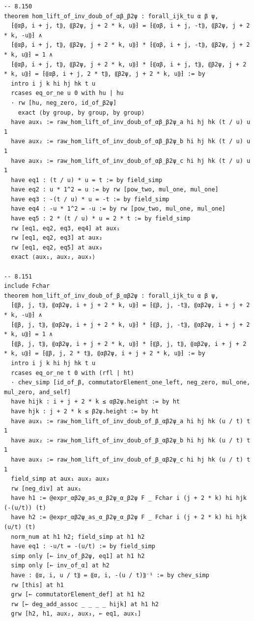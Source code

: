 \begin{Verbatim}
-- 8.150
theorem hom_lift_of_inv_doub_of_αβ_β2ψ : forall_ijk_tu α β ψ,
  ⁅⸨αβ, i + j, t⸩, ⸨β2ψ, j + 2 * k, u⸩⁆ = ⁅⸨αβ, i + j, -t⸩, ⸨β2ψ, j + 2 * k, -u⸩⁆ ∧
  ⁅⸨αβ, i + j, t⸩, ⸨β2ψ, j + 2 * k, u⸩⁆ * ⁅⸨αβ, i + j, -t⸩, ⸨β2ψ, j + 2 * k, u⸩⁆ = 1 ∧
  ⁅⸨αβ, i + j, t⸩, ⸨β2ψ, j + 2 * k, u⸩⁆ * ⁅⸨αβ, i + j, t⸩, ⸨β2ψ, j + 2 * k, u⸩⁆ = ⁅⸨αβ, i + j, 2 * t⸩, ⸨β2ψ, j + 2 * k, u⸩⁆ := by
  intro i j k hi hj hk t u
  rcases eq_or_ne u 0 with hu | hu
  · rw [hu, neg_zero, id_of_β2ψ]
    exact ⟨by group, by group, by group⟩
  have aux₁ := raw_hom_lift_of_inv_doub_of_αβ_β2ψ_a hi hj hk (t / u) u 1
  have aux₂ := raw_hom_lift_of_inv_doub_of_αβ_β2ψ_b hi hj hk (t / u) u 1
  have aux₃ := raw_hom_lift_of_inv_doub_of_αβ_β2ψ_c hi hj hk (t / u) u 1
  have eq1 : (t / u) * u = t := by field_simp
  have eq2 : u * 1^2 = u := by rw [pow_two, mul_one, mul_one]
  have eq3 : -(t / u) * u = -t := by field_simp
  have eq4 : -u * 1^2 = -u := by rw [pow_two, mul_one, mul_one]
  have eq5 : 2 * (t / u) * u = 2 * t := by field_simp
  rw [eq1, eq2, eq3, eq4] at aux₁
  rw [eq1, eq2, eq3] at aux₂
  rw [eq1, eq2, eq5] at aux₃
  exact ⟨aux₁, aux₂, aux₃⟩

-- 8.151
include Fchar
theorem hom_lift_of_inv_doub_of_β_αβ2ψ : forall_ijk_tu α β ψ,
  ⁅⸨β, j, t⸩, ⸨αβ2ψ, i + j + 2 * k, u⸩⁆ = ⁅⸨β, j, -t⸩, ⸨αβ2ψ, i + j + 2 * k, -u⸩⁆ ∧
  ⁅⸨β, j, t⸩, ⸨αβ2ψ, i + j + 2 * k, u⸩⁆ * ⁅⸨β, j, -t⸩, ⸨αβ2ψ, i + j + 2 * k, u⸩⁆ = 1 ∧
  ⁅⸨β, j, t⸩, ⸨αβ2ψ, i + j + 2 * k, u⸩⁆ * ⁅⸨β, j, t⸩, ⸨αβ2ψ, i + j + 2 * k, u⸩⁆ = ⁅⸨β, j, 2 * t⸩, ⸨αβ2ψ, i + j + 2 * k, u⸩⁆ := by
  intro i j k hi hj hk t u
  rcases eq_or_ne t 0 with (rfl | ht)
  · chev_simp [id_of_β, commutatorElement_one_left, neg_zero, mul_one, mul_zero, and_self]
  have hijk : i + j + 2 * k ≤ αβ2ψ.height := by ht
  have hjk : j + 2 * k ≤ β2ψ.height := by ht
  have aux₁ := raw_hom_lift_of_inv_doub_of_β_αβ2ψ_a hi hj hk (u / t) t 1
  have aux₂ := raw_hom_lift_of_inv_doub_of_β_αβ2ψ_b hi hj hk (u / t) t 1
  have aux₃ := raw_hom_lift_of_inv_doub_of_β_αβ2ψ_c hi hj hk (u / t) t 1
  field_simp at aux₁ aux₂ aux₃
  rw [neg_div] at aux₁
  have h1 := @expr_αβ2ψ_as_α_β2ψ_α_β2ψ F _ Fchar i (j + 2 * k) hi hjk (-(u/t)) (t)
  have h2 := @expr_αβ2ψ_as_α_β2ψ_α_β2ψ F _ Fchar i (j + 2 * k) hi hjk (u/t) (t)
  norm_num at h1 h2; field_simp at h1 h2
  have eq1 : -u/t = -(u/t) := by field_simp
  simp only [← inv_of_β2ψ, eq1] at h1 h2
  simp only [← inv_of_α] at h2
  have : ⸨α, i, u / t⸩ = ⸨α, i, -(u / t)⸩⁻¹ := by chev_simp
  rw [this] at h1
  grw [← commutatorElement_def] at h1 h2
  rw [← deg_add_assoc _ _ _ _ hijk] at h1 h2
  grw [h2, h1, aux₂, aux₃, ← eq1, aux₁]


\end{Verbatim}
